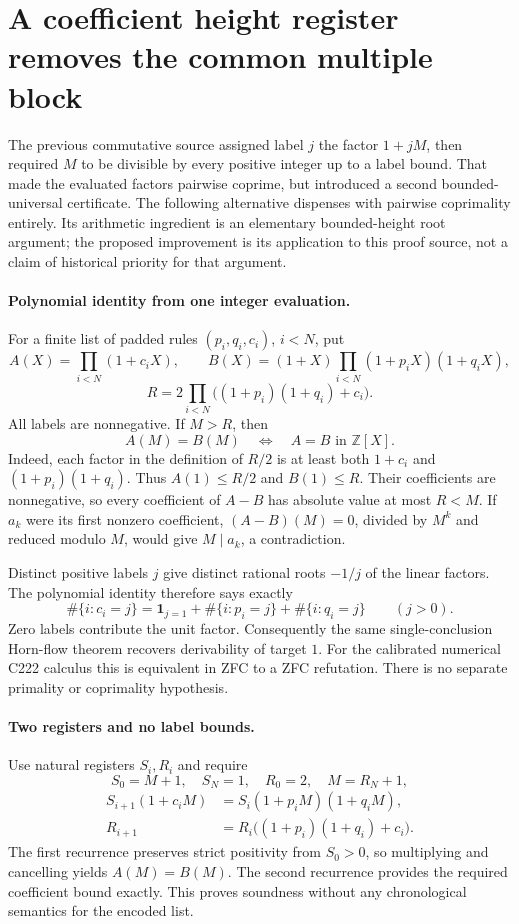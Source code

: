 \section{A coefficient height register removes the common multiple block}

The previous commutative source assigned label $j$ the factor $1+jM$,
then required $M$ to be divisible by every positive integer up to a label
bound. That made the evaluated factors pairwise coprime, but introduced a
second bounded-universal certificate. The following alternative dispenses
with pairwise coprimality entirely. Its arithmetic ingredient is an elementary
bounded-height root argument; the proposed improvement is its application to
this proof source, not a claim of historical priority for that argument.

\paragraph{Polynomial identity from one integer evaluation.}
For a finite list of padded rules $(p_i,q_i,c_i)$, $i<N$, put
\[
 A(X)=\prod_{i<N}(1+c_iX),\qquad
 B(X)=(1+X)\prod_{i<N}(1+p_iX)(1+q_iX),
\]
\[
 R=2\prod_{i<N}\bigl((1+p_i)(1+q_i)+c_i\bigr).
\]
All labels are nonnegative. If $M>R$, then
\[
 A(M)=B(M)\quad\Longleftrightarrow\quad A=B\text{ in }\mathbb Z[X].
\]
Indeed, each factor in the definition of $R/2$ is at least both
$1+c_i$ and $(1+p_i)(1+q_i)$. Thus $A(1)\le R/2$ and $B(1)\le R$.
Their coefficients are nonnegative, so every coefficient of $A-B$ has
absolute value at most $R<M$. If $a_k$ were its first nonzero coefficient,
$(A-B)(M)=0$, divided by $M^k$ and reduced modulo $M$, would give
$M\mid a_k$, a contradiction.

Distinct positive labels $j$ give distinct rational roots $-1/j$ of the
linear factors. The polynomial identity therefore says exactly
\[
 \#\{i:c_i=j\}=\mathbf1_{j=1}+
 \#\{i:p_i=j\}+\#\{i:q_i=j\}\qquad(j>0).
\]
Zero labels contribute the unit factor. Consequently the same
single-conclusion Horn-flow theorem recovers derivability of target $1$.
For the calibrated numerical C222 calculus this is equivalent in ZFC to a
ZFC refutation. There is no separate primality or coprimality hypothesis.

\paragraph{Two registers and no label bounds.}
Use natural registers $S_i,R_i$ and require
\[
 S_0=M+1,\quad S_N=1,\quad R_0=2,\quad M=R_N+1,
\]
\begin{align*}
 S_{i+1}(1+c_iM)&=S_i(1+p_iM)(1+q_iM),\\
 R_{i+1}&=R_i\bigl((1+p_i)(1+q_i)+c_i\bigr).
\end{align*}
The first recurrence preserves strict positivity from $S_0>0$, so
multiplying and cancelling yields $A(M)=B(M)$. The second recurrence
provides the required coefficient bound exactly. This proves soundness
without any chronological semantics for the encoded list.

